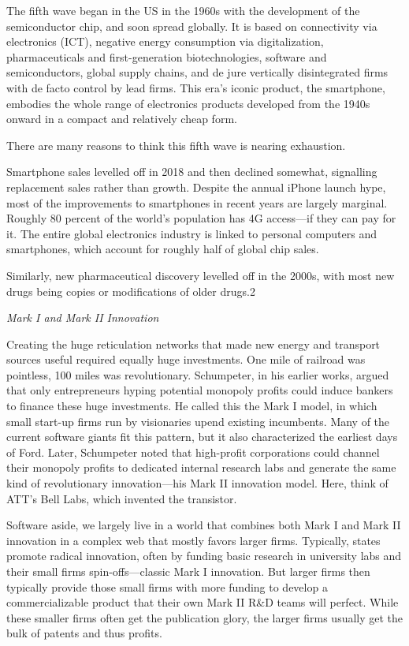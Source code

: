 \documentclass[
]{book}
\begin{document}
The fifth wave began in the US in the 1960s with the development of the semiconductor chip, and soon spread globally. It is based on connectivity via electronics (ICT), negative energy consumption via digitalization, pharmaceuticals and first-generation biotechnologies, software and semiconductors, global supply chains, and de jure vertically disintegrated firms with de facto control by lead firms. This era's iconic product, the smartphone, embodies the whole range of electronics products developed from the 1940s onward in a compact and relatively cheap form.

There are many reasons to think this fifth wave is nearing exhaustion.

Smartphone sales levelled off in 2018 and then declined somewhat, signalling replacement sales rather than growth. Despite the annual iPhone launch hype, most of the improvements to smartphones in recent years are largely marginal. Roughly 80 percent of the world's population has 4G access---if they can pay for it. The entire global electronics industry is linked to personal computers and smartphones, which account for roughly half of global chip sales.

Similarly, new pharmaceutical discovery levelled off in the 2000s, with most new drugs being copies or modifications of older drugs.2

\emph{Mark I and Mark II Innovation}

Creating the huge reticulation networks that made new energy and transport sources useful required equally huge investments. One mile of railroad was pointless, 100 miles was revolutionary. Schumpeter, in his earlier works, argued that only entrepreneurs hyping potential monopoly profits could induce bankers to finance these huge investments. He called this the Mark I model, in which small start-up firms run by visionaries upend existing incumbents. Many of the current software giants fit this pattern, but it also characterized the earliest days of Ford. Later, Schumpeter noted that high-profit corporations could channel their monopoly profits to dedicated internal research labs and generate the same kind of revolutionary innovation---his Mark II innovation model. Here, think of ATT's Bell Labs, which invented the transistor.

Software aside, we largely live in a world that combines both Mark I and Mark II innovation in a complex web that mostly favors larger firms. Typically, states promote radical innovation, often by funding basic research in university labs and their small firms spin-offs---classic Mark I innovation. But larger firms then typically provide those small firms with more funding to develop a commercializable product that their own Mark II R\&D teams will perfect. While these smaller firms often get the publication glory, the larger firms usually get the bulk of patents and thus profits.
\end{document}
